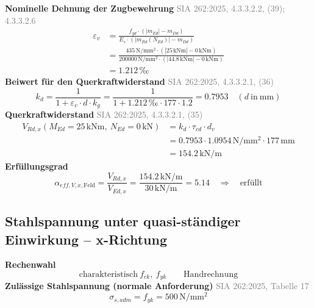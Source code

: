 \documentclass[11pt,a4paper]{article}
\newcommand{\normref}[1]{{\small\textcolor{gray}{#1}}}
\begin{document}
\noindent\textbf{Nominelle Dehnung der Zugbewehrung} \hfill \normref{SIA 262:2025, 4.3.3.2.2, (39); 4.3.3.2.6}
\begin{equation*}
\begin{aligned}
  \varepsilon_v &= \frac{f_{yd} \cdot \left(\left|m_{Ed}\right| - m_{Dd}\right)}{E_s \cdot \left(\left|m_{Rd}(N_{Ed})\right| - m_{Dd}\right)} \\
  &= \frac{435\,\mathrm{N}/\mathrm{mm}^{2} \cdot \left(\left|25\,\mathrm{kNm}\right| - 0\,\mathrm{kNm}\right)}{200000\,\mathrm{N}/\mathrm{mm}^{2} \cdot \left(\left|44.8\,\mathrm{kNm}\right| - 0\,\mathrm{kNm}\right)} \\
  &= 1.212\,\text{‰}
\end{aligned}
\end{equation*}
\noindent\textbf{Beiwert für den Querkraftwiderstand} \hfill \normref{SIA 262:2025, 4.3.3.2.1, (36)}
\begin{equation*}
k_d = \frac{1}{1 + \varepsilon_v \cdot d \cdot k_g} = \frac{1}{1 + 1.212\,\text{‰} \cdot 177 \cdot 1.2} = 0.7953 \quad \left(d\ \text{in}\ \mathrm{mm}\right)
\end{equation*}
\noindent\textbf{Querkraftwiderstand} \hfill \normref{SIA 262:2025, 4.3.3.2.1, (35)}
\begin{equation*}
\begin{aligned}
  V_{Rd,x}(M_{Ed} = 25\,\mathrm{kNm},\ N_{Ed} = 0\,\mathrm{kN}) &= k_d \cdot \tau_{cd} \cdot d_v \\
  &= 0.7953 \cdot 1.0954\,\mathrm{N}/\mathrm{mm}^{2} \cdot 177\,\mathrm{mm} \\
  &= 154.2\,\mathrm{kN}/\mathrm{m}
\end{aligned}
\end{equation*}
\noindent\textbf{Erfüllungsgrad}
\begin{equation*}
\alpha_{eff,V,x,\text{Feld}} = \frac{V_{Rd,x}}{V_{Ed,x}} = \frac{154.2\,\mathrm{kN}/\mathrm{m}}{30\,\mathrm{kN}/\mathrm{m}} = 5.14 \quad \Rightarrow \quad \text{erfüllt}
\end{equation*}
\subsection{Stahlspannung unter quasi-ständiger Einwirkung – x-Richtung}
\noindent\textbf{Rechenwahl}
\begin{equation*}
\text{charakteristisch}\ f_{ck},\ f_{yk} \qquad \text{Handrechnung}
\end{equation*}
\noindent\textbf{Zulässige Stahlspannung (normale Anforderung)} \hfill \normref{SIA 262:2025, Tabelle 17}
\begin{equation*}
\sigma_{s,adm} = f_{yk} = 500\,\mathrm{N}/\mathrm{mm}^{2}
\end{equation*}
\end{document}
